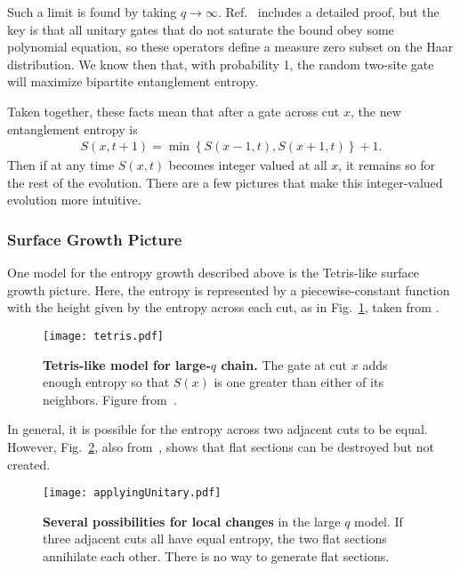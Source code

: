 Such a limit is found by taking $q\to\infty$. Ref.~\cite{Nahum2017} includes a detailed proof, but the key is that all unitary gates that do not saturate the bound obey some polynomial equation, so these operators define a measure zero subset on the Haar distribution. We know then that, with probability 1, the random two-site gate will maximize bipartite entanglement entropy.

Taken together, these facts mean that after a gate across cut $x$, the new entanglement entropy is
\begin{align}
S(x, t+1) = \min\left\lbrace S(x-1, t), S(x+1, t)\right\rbrace + 1.
	\label{eqn:update}
\end{align}
Then if at any time $S(x,t)$ becomes integer valued at all $x$, it remains so for the rest of the evolution. There are a few pictures that make this integer-valued evolution more intuitive.

\subsubsection{Surface Growth Picture}  \label{subsub:surfgrowth}

One model for the entropy growth described above is the Tetris-like surface growth picture. Here, the entropy is represented by a piecewise-constant function with the height given by the entropy across each cut, as in Fig.~\ref{fig:tetris}, taken from \cite{Nahum2017}. 
\begin{figure}
	\centering
	\texttt{[image: tetris.pdf]}
	\caption{\textbf{Tetris-like model for large-$q$ chain.} The gate at cut $x$ adds enough entropy so that $S(x)$ is one greater than either of its neighbors. Figure from~\cite{Nahum2017}.}
	\label{fig:tetris}
\end{figure}
In general, it is possible for the entropy across two adjacent cuts to be equal. However, Fig.~\ref{fig:applyingUnitary}, also from~\cite{Nahum2017}, shows that flat sections can be destroyed but not created. 
\begin{figure}
	\centering
	\texttt{[image: applyingUnitary.pdf]}
	\caption{\textbf{Several possibilities for local changes} in the large $q$ model. If three adjacent cuts all have equal entropy, the two flat sections annihilate each other. There is no way to generate flat sections.}
	\label{fig:applyingUnitary}
\end{figure}

